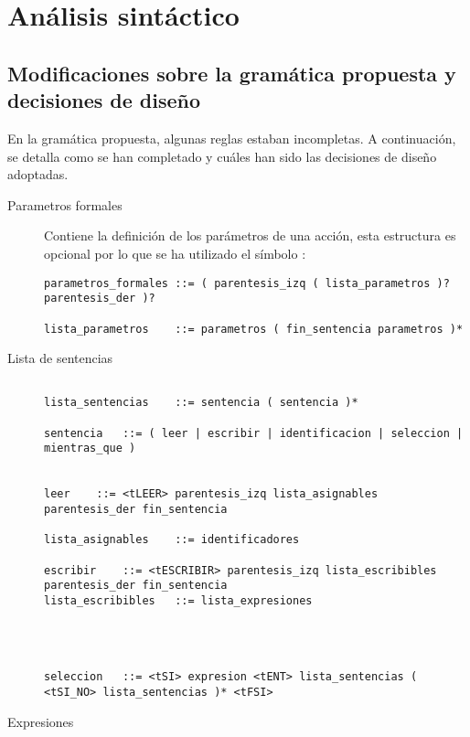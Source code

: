 \documentclass[../main.tex]{subfiles}
\begin{document}
\section{Análisis sintáctico}

\subsection{Modificaciones sobre la gramática propuesta y decisiones de diseño}
En la gramática propuesta, algunas reglas estaban incompletas.
A continuación, se detalla como se han completado y cuáles han sido las decisiones de diseño adoptadas.

\begin{description}
\item[Parametros formales] Contiene la definición de los parámetros de una acción, esta estructura es opcional por lo que se ha utilizado el símbolo :
\begin{verbatim}
parametros_formales	::=	( parentesis_izq ( lista_parametros )? parentesis_der )?

lista_parametros	::=	parametros ( fin_sentencia parametros )*

\end{verbatim}


\item[Lista de sentencias]

\begin{verbatim}

lista_sentencias	::=	sentencia ( sentencia )*

sentencia	::=	( leer | escribir | identificacion | seleccion | mientras_que )


leer	::=	<tLEER> parentesis_izq lista_asignables parentesis_der fin_sentencia

lista_asignables	::=	identificadores

escribir	::=	<tESCRIBIR> parentesis_izq lista_escribibles parentesis_der fin_sentencia
lista_escribibles	::=	lista_expresiones




seleccion	::=	<tSI> expresion <tENT> lista_sentencias ( <tSI_NO> lista_sentencias )* <tFSI>

\end{verbatim}


\item[Expresiones]

\begin{verbatim}


\end{verbatim}
\end{description}
\end{document}
